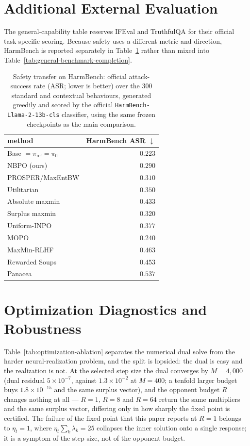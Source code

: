 \documentclass{article}
\theoremstyle{remark}
\theoremstyle{plain}
\newcommand{\piref}{\pi_{\mathrm{ref}}}
\newcommand{\NBPO}{\textsc{NBPO}}
\begin{document}
\section{Additional External Evaluation}
\label{app:external-evaluation}
The general-capability table reserves IFEval and TruthfulQA for their official
task-specific scoring. Because safety uses a different metric and direction,
HarmBench is reported separately in Table~\ref{tab:safety-transfer} rather than
mixed into Table~\ref{tab:general-benchmark-completion}.

\begin{table}[t]
\centering\footnotesize
\setlength{\tabcolsep}{4.0pt}
\caption{Safety transfer on HarmBench: official attack-success rate (ASR; lower is better) over the $300$ standard and contextual behaviours, generated greedily and scored by the official \texttt{HarmBench-Llama-2-13b-cls} classifier, using the same frozen checkpoints as the main comparison.}
\label{tab:safety-transfer}
\begin{tabular}{lr}
\toprule
method & HarmBench ASR $\downarrow$ \\
\midrule
Base $=\piref=\pi_0$ & $\mathbf{0.223}$\\
\NBPO{} (ours) & $0.290$\\
PROSPER/MaxEntBW & $0.310$\\
Utilitarian & $0.350$\\
Absolute maxmin & $0.433$\\
Surplus maxmin & $0.320$\\
Uniform-INPO & $0.377$\\
MOPO & $0.240$\\
MaxMin-RLHF & $0.463$\\
Rewarded Soups & $0.453$\\
Panacea & $0.537$\\
\bottomrule
\end{tabular}
\end{table}

\section{Optimization Diagnostics and Robustness}
\label{app:optimization-diagnostics}
Table~\ref{tab:optimization-ablation} separates the numerical dual solve from the harder
neural-realization problem, and the split is lopsided: the dual is easy and the realization is not.
At the selected step size the dual converges by $M=4{,}000$ (dual residual $5\times10^{-7}$, against $1.3\times10^{-2}$
at $M=400$; a tenfold larger budget buys $1.8\times10^{-15}$ and the same surplus vector), and the opponent budget $R$ changes nothing at all --- $R=1$, $R=8$
and $R=64$ return the same multipliers and the same surplus vector, differing only in how sharply
the fixed point is certified. The failure of the fixed point that this paper reports at $R=1$
belongs to $\eta_t=1$, where $\eta_t\sum_k\lambda_k=25$ collapses the inner solution onto a single
response; it is a symptom of the step size, not of the opponent budget.
\end{document}
